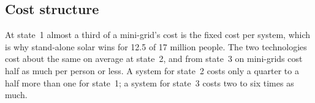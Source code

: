 \documentclass[11pt,a4paper]{article}
\begin{document}
\subsection{Cost structure}
\begin{table}[!ht]\centering\small
\caption{Demand states and cost by technology, off-grid domain.}\label{tab:cost}
\end{table}
At state~1 almost a third of a mini-grid's cost is the fixed cost per system, which is why stand-alone solar wins
for 12.5 of 17 million people. The two technologies cost about the same on average at state~2, and from state~3 on
mini-grids cost half as much per person or less. A system for state~2 costs only a quarter to a half more than
one for state~1; a system for state~3 costs two to six times as much.
\end{document}
